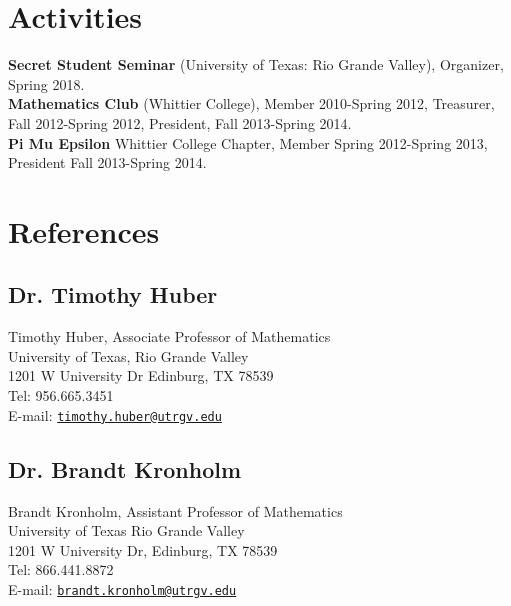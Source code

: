 \documentclass[letterpaper]{article}
\begin{document}
\section*{{\bf Activities}}
{\bf Secret Student Seminar} (University of Texas: Rio Grande Valley), Organizer, Spring 2018.\vspace{.2cm}\\
{\bf Mathematics Club} (Whittier College), Member 2010-Spring 2012, Treasurer, Fall 2012-Spring 2012, President, Fall 2013-Spring 2014. \vspace{.2cm}\\
{\bf Pi Mu Epsilon} Whittier College Chapter, Member Spring 2012-Spring 2013, President Fall 2013-Spring 2014.\vspace{.2cm} \\

\section*{{\bf References}}
\subsection*{Dr. Timothy Huber}
Timothy Huber, Associate Professor of Mathematics
\\University of Texas, Rio Grande Valley
\\1201 W University Dr Edinburg, TX 78539
\\Tel: 956.665.3451
\\E-mail: \href{mailto:timothy.huber@utrgv.edu}{\tt timothy.huber@utrgv.edu}


\subsection*{Dr. Brandt Kronholm}
Brandt Kronholm, Assistant Professor of Mathematics
\\University of Texas Rio Grande Valley
\\1201 W University Dr, Edinburg, TX 78539
\\Tel: 866.441.8872
\\E-mail:  \href{mailto:brandt.kronholm@utrgv.edu}{\tt brandt.kronholm@utrgv.edu}
\end{document}
